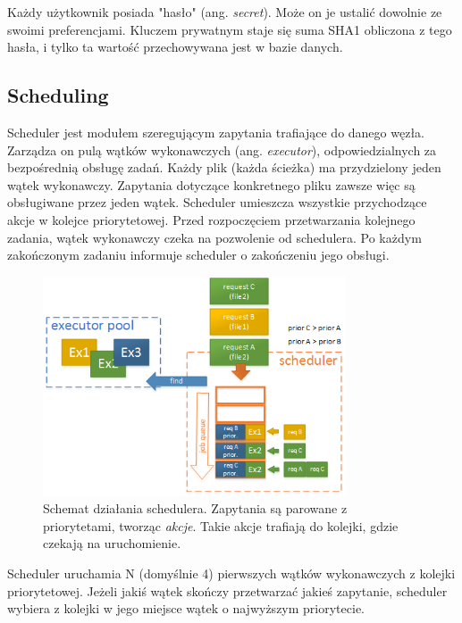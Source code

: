 Każdy użytkownik posiada "hasło" (ang. \textit{secret}). Może on je ustalić dowolnie ze swoimi preferencjami. Kluczem prywatnym staje się suma SHA1 obliczona z tego hasła, i tylko ta wartość przechowywana jest w bazie danych.

\subsection{Scheduling}
Scheduler jest modułem szeregującym zapytania trafiające do danego węzła. Zarządza on pulą wątków wykonawczych (ang. \textit{executor}), odpowiedzialnych za bezpośrednią obsługę zadań. Każdy plik (każda ścieżka) ma przydzielony jeden wątek wykonawczy. Zapytania dotyczące konkretnego pliku zawsze więc są obsługiwane przez jeden wątek.
Scheduler umieszcza wszystkie przychodzące akcje w kolejce priorytetowej. Przed rozpoczęciem przetwarzania kolejnego zadania, wątek wykonawczy czeka na pozwolenie od schedulera. Po każdym zakończonym zadaniu informuje scheduler o zakończeniu jego obsługi.

\begin{figure}[!htbp]
	\centering
	\includegraphics[width=0.8\textwidth]{images/fig03-scheduler.png}
	\caption[Schemat działania schedulera.]{Schemat działania schedulera. Zapytania są parowane z priorytetami, tworząc \textit{akcje}. Takie akcje trafiają do kolejki, gdzie czekają na uruchomienie.}
	\label{fig:scheduler}
\end{figure}

Scheduler uruchamia N (domyślnie 4) pierwszych wątków wykonawczych z kolejki priorytetowej. Jeżeli jakiś wątek skończy przetwarzać jakieś zapytanie, scheduler wybiera z kolejki w jego miejsce wątek o najwyższym priorytecie.
